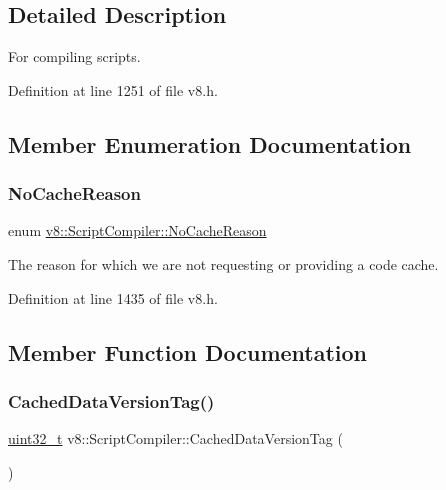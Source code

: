 \subsection{Detailed Description}
For compiling scripts. 

Definition at line 1251 of file v8.\+h.



\subsection{Member Enumeration Documentation}
\mbox{\label{classv8_1_1ScriptCompiler_a7f13fa15484cfc500ae51927756e0d60}} 
\subsubsection{\texorpdfstring{No\+Cache\+Reason}{NoCacheReason}}
{\footnotesize\ttfamily enum \mbox{\hyperlink{classv8_1_1ScriptCompiler_a7f13fa15484cfc500ae51927756e0d60}{v8\+::\+Script\+Compiler\+::\+No\+Cache\+Reason}}}

The reason for which we are not requesting or providing a code cache. 

Definition at line 1435 of file v8.\+h.



\subsection{Member Function Documentation}
\mbox{\label{classv8_1_1ScriptCompiler_ab0728cc7751340381f2b660af8c7b35b}} 
\subsubsection{\texorpdfstring{Cached\+Data\+Version\+Tag()}{CachedDataVersionTag()}}
{\footnotesize\ttfamily \mbox{\hyperlink{classuint32__t}{uint32\+\_\+t}} v8\+::\+Script\+Compiler\+::\+Cached\+Data\+Version\+Tag (\begin{DoxyParamCaption}{ }\end{DoxyParamCaption})\hspace{0.3cm}{\ttfamily [static]}}

